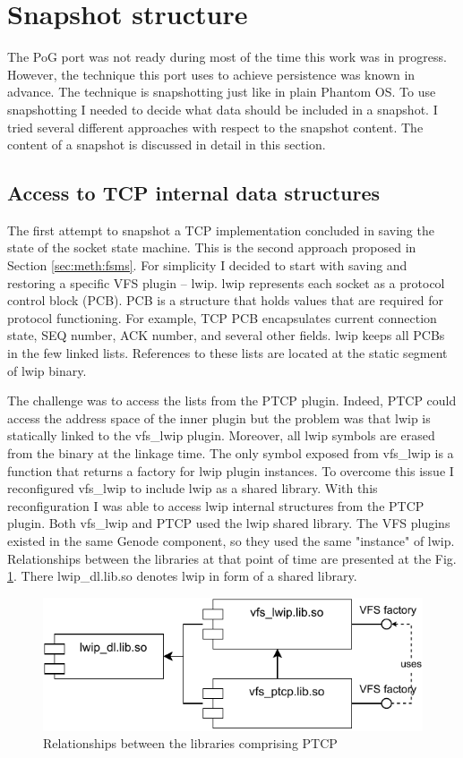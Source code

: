 \section{Snapshot structure}

The PoG port was not ready during most of the time this work was in
progress. However, the technique this port uses to achieve persistence was
known in advance. The technique is snapshotting just like in plain Phantom OS.
To use snapshotting I needed to decide what data should be included in a
snapshot. I tried several different approaches with respect to the snapshot
content. The content of a snapshot is discussed in detail in this section.

\subsection{Access to TCP internal data structures}

The first attempt to snapshot a TCP implementation concluded in saving the
state of the socket state machine. This is the second approach proposed in
Section \ref{sec:meth:fsms}. For simplicity I decided to start with saving and
restoring a specific VFS plugin -- lwip. lwip represents each socket as a
protocol control block (PCB). PCB is a structure that holds values that are
required for protocol functioning. For example, TCP PCB encapsulates current
connection state, SEQ number, ACK number, and several other fields. lwip keeps
all PCBs in the few linked lists. References to these lists are located at
the static segment of lwip binary.

The challenge was to access the lists from the PTCP plugin. Indeed, PTCP could
access the address space of the inner plugin but the problem was that lwip is
statically linked to the vfs\_lwip plugin. Moreover, all lwip symbols are
erased from the binary at the linkage time. The only symbol exposed from
vfs\_lwip is a function that returns a factory for lwip plugin instances. To
overcome this issue I reconfigured vfs\_lwip to include lwip as a shared
library. With this reconfiguration I was able to access lwip internal
structures from the PTCP plugin. Both vfs\_lwip and PTCP used the lwip shared
library. The VFS plugins existed in the same Genode component, so they used
the same "instance" of lwip. Relationships between the libraries at that point
of time are presented at the Fig. \ref{fig:lib_deps}. There lwip\_dl.lib.so
denotes lwip in form of a shared library.

\begin{figure}
    \centering
    \includegraphics[]{figs/ptcp_libs.pdf}
    \caption{Relationships between the libraries comprising PTCP}
    \label{fig:lib_deps}
\end{figure}

